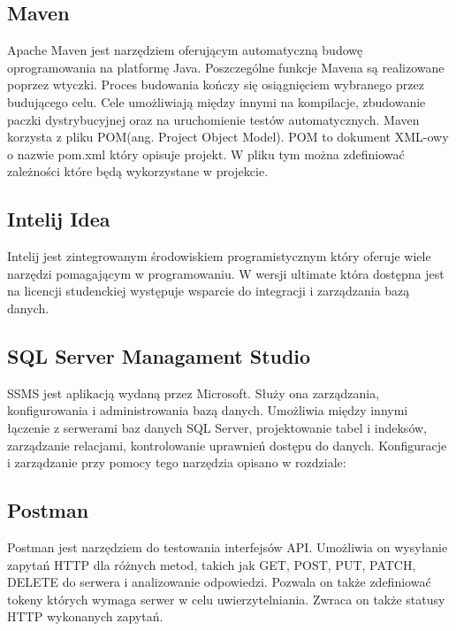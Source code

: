 \subsection{Maven}
Apache Maven jest narzędziem oferującym automatyczną budowę oprogramowania na platformę Java. Poszczególne funkcje Mavena są realizowane poprzez wtyczki. Proces budowania kończy się osiągnięciem wybranego przez budującego celu. Cele umożliwiają między innymi na kompilacje, zbudowanie paczki dystrybucyjnej oraz na uruchomienie testów automatycznych. Maven korzysta z pliku POM(ang. Project Object Model). POM to dokument XML-owy o nazwie pom.xml który opisuje projekt. W pliku tym można zdefiniować zależności które będą wykorzystane w projekcie. 

\subsection{Intelij Idea}
Intelij jest zintegrowanym środowiskiem programistycznym który oferuje wiele narzędzi pomagającym w programowaniu. W wersji ultimate która dostępna jest na licencji studenckiej występuje wsparcie do integracji i zarządzania bazą danych.

\subsection{SQL Server Managament Studio}
\label{ssms:label}
SSMS jest aplikacją wydaną przez Microsoft. Służy ona zarządzania, konfigurowania i administrowania bazą danych. Umożliwia między innymi łączenie z serwerami baz danych SQL Server, projektowanie tabel i indeksów, zarządzanie relacjami, kontrolowanie uprawnień dostępu do danych. Konfiguracje i zarządzanie przy pomocy tego narzędzia opisano w rozdziale: \textbf{}

\subsection{Postman}
Postman jest narzędziem do testowania interfejsów API. Umożliwia on wysyłanie zapytań HTTP dla różnych metod, takich jak GET, POST, PUT, PATCH, DELETE do serwera i analizowanie odpowiedzi. Pozwala on także zdefiniować tokeny których wymaga serwer w celu uwierzytelniania. Zwraca on także statusy HTTP wykonanych zapytań.



